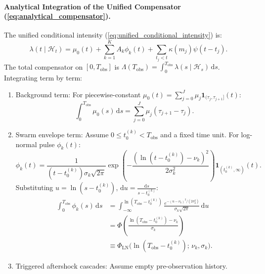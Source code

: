 \paragraph{Analytical Integration of the Unified Compensator
(\cref{eq:analytical_compensator}).}
The unified conditional intensity
(\cref{eq:unified_conditional_intensity}) is:
\begin{equation}
  \lambda(t \mid \mathcal{H}_t) = \mu_0(t) + \sum_{k=1}^K A_k
  \phi_k(t) + \sum_{t_j < t} \kappa(m_j)\psi(t - t_j).
\end{equation}
The total compensator on $[0, T_{\mathrm{obs}}]$ is
$\Lambda(T_{\mathrm{obs}}) = \int_0^{T_{\mathrm{obs}}} \lambda(s
\mid \mathcal{H}_s)\,\mathrm{d}s$.
Integrating term by term:
\begin{enumerate}
  \item Background term: For piecewise-constant $\mu_0(t) =
    \sum_{j=0}^J \mu_j \mathbf{1}_{(\tau_j, \tau_{j+1}]}(t)$:
    \begin{equation}
      \int_0^{T_{\mathrm{obs}}} \mu_0(s)\,\mathrm{d}s = \sum_{j=0}^J
      \mu_j (\tau_{j+1} - \tau_j).
    \end{equation}
  \item Swarm envelope term: Assume $0\le t_0^{(k)}<T_{\mathrm{obs}}$
    and a fixed time unit. For log-normal pulse $\phi_k(t)$:
    \begin{equation}
      \phi_k(t) = \frac{1}{(t -
      t_0^{(k)})\sigma_k\sqrt{2\pi}}\exp\left(-\frac{(\ln(t -
            t_0^{(k)}) -
      \nu_k)^2}{2\sigma_k^2}\right)\mathbf{1}_{(t_0^{(k)}, \infty)}(t).
    \end{equation}
    Substituting $u = \ln(s - t_0^{(k)})$, $\mathrm{d}u =
    \frac{\mathrm{d}s}{s - t_0^{(k)}}$:
    \begin{equation}
      \begin{aligned}
        \int_0^{T_{\mathrm{obs}}} \phi_k(s)\,\mathrm{d}s
        &=\int_{-\infty}^{\ln(T_{\mathrm{obs}}-t_0^{(k)})}
        \frac{e^{-(u-\nu_k)^2/(2\sigma_k^2)}}{\sigma_k\sqrt{2\pi}}
        \,\mathrm{d}u \\
        &=\Phi\left(\frac{\ln(T_{\mathrm{obs}}-t_0^{(k)})-\nu_k}{\sigma_k}\right)
        \\
        &\equiv\Phi_{\mathrm{LN}}\bigl(\ln(T_{\mathrm{obs}}-t_0^{(k)});
        \,\nu_k,\sigma_k\bigr).
      \end{aligned}
    \end{equation}
  \item Triggered aftershock cascades: Assume empty pre-observation history.

\end{enumerate}
